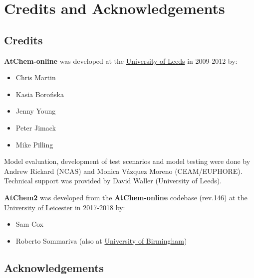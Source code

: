 %
%
%
%

\chapter{Credits and Acknowledgements} \label{ch:credits}

\section{Credits} \label{sec:credits}

\textbf{AtChem-online} was developed at the
\href{https://www.leeds.ac.uk}{University of Leeds} in 2009-2012 by:

\begin{itemize}
\item Chris Martin
\item Kasia Boro{\'n}ska
\item Jenny Young
\item Peter Jimack
\item Mike Pilling
\end{itemize}

Model evaluation, development of test scenarios and model testing were
done by Andrew Rickard (NCAS) and Monica V{\'a}zquez Moreno (CEAM/EUPHORE).
Technical support was provided by David Waller (University of Leeds).

\textbf{AtChem2} was developed from the \textbf{AtChem-online}
codebase (rev.146) at the \href{https://le.ac.uk}{University of
  Leicester} in 2017-2018 by:

\begin{itemize}
\item Sam Cox
\item Roberto Sommariva (also at \href{https://www.birmingham.ac.uk}{University of Birmingham})
\end{itemize}

\section{Acknowledgements} \label{sec:acknowledgements}


